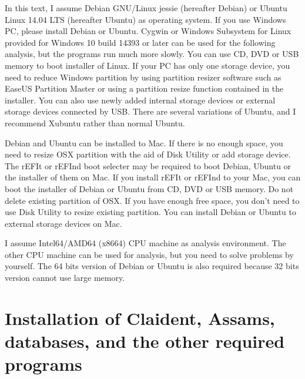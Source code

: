 \documentclass[titlepage,10pt,a4paper,english]{jsbook}
\begin{document}
In this text, I assume Debian GNU/Linux jessie (hereafter Debian) or Ubuntu Linux 14.04 LTS (hereafter Ubuntu) as operating system.
If you use Windows PC, please install Debian or Ubuntu.
Cygwin or Windows Subsystem for Linux provided for Windows 10 build 14393 or later can be used for the following analysis, but the programs run much more slowly.
You can use CD, DVD or USB memory to boot installer of Linux.
If your PC has only one storage device, you need to reduce Windows partition by using partition resizer software such as EaseUS Partition Master or using a partition resize function contained in the installer.
You can also use newly added internal storage devices or external storage devices connected by USB.
There are several variations of Ubuntu, and I recommend Xubuntu rather than normal Ubuntu.

Debian and Ubuntu can be installed to Mac.
If there is no enough space, you need to resize OSX partition with the aid of Disk Utility or add storage device.
The rEFIt or rEFInd boot selecter may be required to boot Debian, Ubuntu or the installer of them on Mac.
If you install rEFIt or rEFInd to your Mac, you can boot the installer of Debian or Ubuntu from CD, DVD or USB memory.
Do not delete existing partition of OSX.
If you have enough free space, you don't need to use Disk Utility to resize existing partition.
You can install Debian or Ubuntu to external storage devices on Mac.

I assume Intel64/AMD64 (x86{\textunderscore}64) CPU machine as analysis environment.
The other CPU machine can be used for analysis, but you need to solve problems by yourself.
The 64 bits version of Debian or Ubuntu is also required because 32 bits version cannot use large memory.

\section{Installation of Claident, Assams, databases, and the other required programs}
\end{document}

